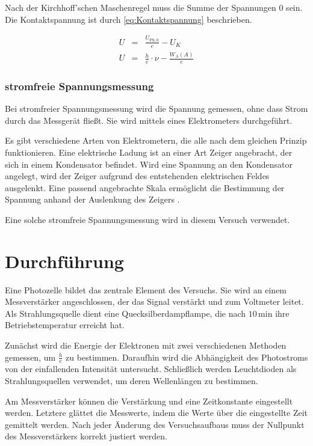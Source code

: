 \documentclass[12pt,a4paper]{scrartcl}
\numberwithin{equation}{section} %
\begin{document}
Nach der Kirchhoff'schen Maschenregel muss die Summe der Spannungen $0$ sein. Die Kontaktspannung ist durch \eqref{eq:Kontaktspannung} beschrieben.

\begin{eqnarray}
	U &=& \frac{U_{\mathrm{Ph},0}}{e} - U_K \\
	U &=& \frac{h}{e}\cdot \nu - \frac{W_A(A)}{e}  \label{eq:Stoppspannung Geradengleichung}
\end{eqnarray}

\subsubsection{stromfreie Spannungsmessung}
Bei stromfreier Spannungsmessung wird die Spannung gemessen, ohne dass Strom durch das Messgerät fließt. Sie wird mittels eines Elektrometers durchgeführt.

Es gibt verschiedene Arten von Elektrometern, die alle nach dem gleichen Prinzip funktionieren. Eine elektrische Ladung ist an einer Art Zeiger angebracht, der sich in einem Kondensator befindet. Wird eine Spannung an den Kondensator angelegt, wird der Zeiger aufgrund des entstehenden elektrischen Feldes ausgelenkt. Eine passend angebrachte Skala ermöglicht die Bestimmung der Spannung anhand der Auslenkung des Zeigers \cite{Gerthsen}.

Eine solche stromfreie Spannungsmessung wird in diesem Versuch verwendet.

\clearpage
\hypertarget{durchfuxfchrung}{\section{Durchführung}\label{durchfuxfchrung}}
Eine Photozelle bildet das zentrale Element des Versuchs. Sie wird an einem Messverstärker angeschlossen, der das Signal verstärkt und zum Voltmeter leitet. Als Strahlungsquelle dient eine Quecksilberdampflampe, die nach $10\mathrm{\,min}$ ihre Betriebstemperatur erreicht hat.

Zunächst wird die Energie der Elektronen mit zwei verschiedenen Methoden gemessen, um $\frac{h}{e}$ zu bestimmen. Daraufhin wird die Abhängigkeit des Photostroms von der einfallenden Intensität untersucht. Schließlich werden Leuchtdioden als Strahlungsquellen verwendet, um deren Wellenlängen zu bestimmen.

Am Messverstärker können die Verstärkung und eine Zeitkonstante eingestellt werden. Letztere glättet die Messwerte, indem die Werte über die eingestellte Zeit gemittelt werden. Nach jeder Änderung des Versuchsaufbaus muss der Nullpunkt des Messverstärkers korrekt justiert werden.
\end{document}
